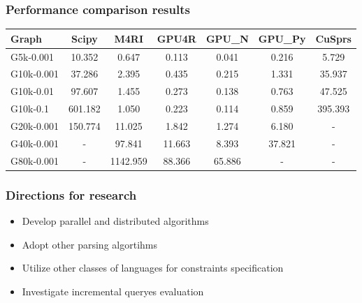 \documentclass[xcolor=table]{beamer}
\begin{document}
\begin{frame}[fragile]
\frametitle{Performance comparison results}
\centering


{\setlength{\tabcolsep}{0.25em}
\begin{tabular}{| l | c | c | c | c | c | c | }
    \hline
    Graph              & Scipy   & M4RI     & GPU4R  & GPU\_N & GPU\_Py & CuSprs  \\
    \hline
    \hline
    \small{G5k-0.001}  & 10.352  & 0.647    & 0.113  & 0.041  & 0.216   & 5.729   \\
    \small{G10k-0.001} & 37.286  & 2.395    & 0.435  & 0.215  & 1.331   & 35.937  \\
    \small{G10k-0.01}  & 97.607  & 1.455    & 0.273  & 0.138  & 0.763   & 47.525  \\
    \small{G10k-0.1}   & 601.182 & 1.050    & 0.223  & 0.114  & 0.859   & 395.393 \\
    \small{G20k-0.001} & 150.774 & 11.025   & 1.842  & 1.274  & 6.180   & -       \\
    \small{G40k-0.001} & -       & 97.841   & 11.663 & 8.393  & 37.821  & -       \\
    \small{G80k-0.001} & -       & 1142.959 & 88.366 & 65.886 & -       & -       \\
    \hline
  \end{tabular}

}

\end{frame}


\begin{frame} \frametitle{Directions for research}
\begin{itemize}
\item Develop parallel and distributed algorithms
\item Adopt other parsing algortihms
\item Utilize other classes of languages for constraints specification
\item Investigate incremental queryes evaluation
\end{itemize}
\end{frame}
\end{document}
